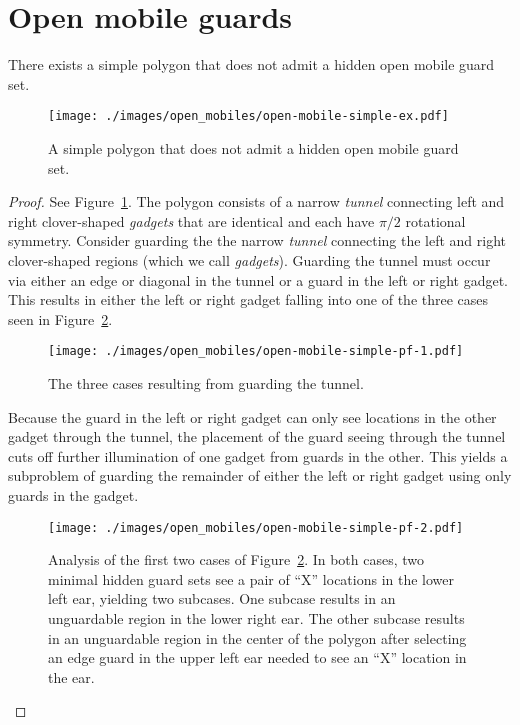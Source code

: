 \documentclass{cccg12}
\begin{document}
\section{Open mobile guards}
\label{sec:open-mobiles}

\begin{lemma}
There exists a simple polygon that does not admit a hidden open mobile guard set.
\end{lemma}

\begin{figure}[ht]
\centering
\texttt{[image: ./images/open\_mobiles/open-mobile-simple-ex.pdf]}
\caption{A simple polygon that does not admit a hidden open mobile guard set.}
\label{fig:open-mobile-simple-ex}
\end{figure}

\begin{proof}
See Figure~\ref{fig:open-mobile-simple-ex}.
The polygon consists of a narrow \emph{tunnel} connecting left and right clover-shaped \emph{gadgets} that are identical and each have $\pi/2$ rotational symmetry.
Consider guarding the the narrow \emph{tunnel} connecting the left and right clover-shaped regions (which we call \emph{gadgets}).
Guarding the tunnel must occur via either an edge or diagonal in the tunnel or a guard in the left or right gadget.
This results in either the left or right gadget falling into one of the three cases seen in Figure~\ref{fig:open-mobile-simple-pf-1}. 

\begin{figure}[ht]
\centering
\texttt{[image: ./images/open\_mobiles/open-mobile-simple-pf-1.pdf]}
\caption{The three cases resulting from guarding the tunnel.}
\label{fig:open-mobile-simple-pf-1}
\end{figure}

Because the guard in the left or right gadget can only see locations in the other gadget through the tunnel, the placement of the guard seeing through the tunnel cuts off further illumination of one gadget from guards in the other.
This yields a subproblem of guarding the remainder of either the left or right gadget using only guards in the gadget.

\begin{figure}[ht]
\centering
\texttt{[image: ./images/open\_mobiles/open-mobile-simple-pf-2.pdf]}
\caption{Analysis of the first two cases of Figure~\ref{fig:open-mobile-simple-pf-1}.
In both cases, two minimal hidden guard sets see a pair of ``X'' locations in the lower left ear, yielding two subcases.
One subcase results in an unguardable region in the lower right ear.
The other subcase results in an unguardable region in the center of the polygon after selecting an edge guard in the upper left ear needed to see an ``X'' location in the ear.} 
\label{fig:open-mobile-simple-pf-2}
\end{figure}


\end{proof}
\end{document}
